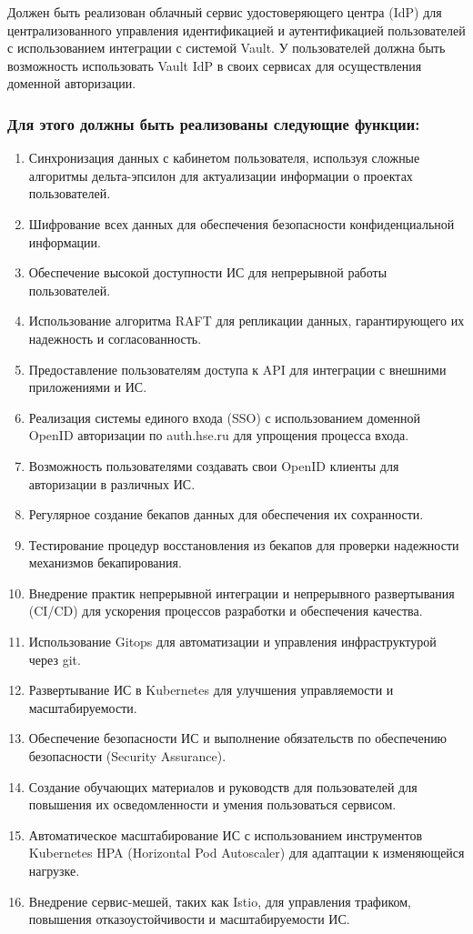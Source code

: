 \documentclass[14pt, a4paper]{extarticle}
\begin{document}
Должен быть реализован облачный сервис удостоверяющего центра (IdP) для централизованного управления идентификацией и аутентификацией пользователей с использованием интеграции с системой Vault.
У пользователей должна быть возможность использовать Vault IdP в своих сервисах для осуществления доменной авторизации.

\subsubsection*{Для этого должны быть реализованы следующие функции:}

\begin{enumerate}
\item Синхронизация данных с кабинетом пользователя, используя сложные алгоритмы дельта-эпсилон для актуализации информации о проектах пользователей.
\item Шифрование всех данных для обеспечения безопасности конфиденциальной информации.
\item Обеспечение высокой доступности ИС для непрерывной работы пользователей.
\item Использование алгоритма RAFT для репликации данных, гарантирующего их надежность и согласованность.
\item Предоставление пользователям доступа к API для интеграции с внешними приложениями и ИС.
\item Реализация системы единого входа (SSO) с использованием доменной OpenID авторизации по auth.hse.ru для упрощения процесса входа.
\item Возможность пользователями создавать свои OpenID клиенты для авторизации в различных ИС.
\item Регулярное создание бекапов данных для обеспечения их сохранности.
\item Тестирование процедур восстановления из бекапов для проверки надежности механизмов бекапирования.
\item Внедрение практик непрерывной интеграции и непрерывного развертывания (CI/CD) для ускорения процессов разработки и обеспечения качества.
\item Использование Gitops для автоматизации и управления инфраструктурой через git.
\item Развертывание ИС в Kubernetes для улучшения управляемости и масштабируемости.
\item Обеспечение безопасности ИС и выполнение обязательств по обеспечению безопасности (Security Assurance).
\item Создание обучающих материалов и руководств для пользователей для повышения их осведомленности и умения пользоваться сервисом.
\item Автоматическое масштабирование ИС с использованием инструментов Kubernetes HPA (Horizontal Pod Autoscaler) для адаптации к изменяющейся нагрузке.
\item Внедрение сервис-мешей, таких как Istio, для управления трафиком, повышения отказоустойчивости и масштабируемости ИС.
\end{enumerate}
\end{document}
